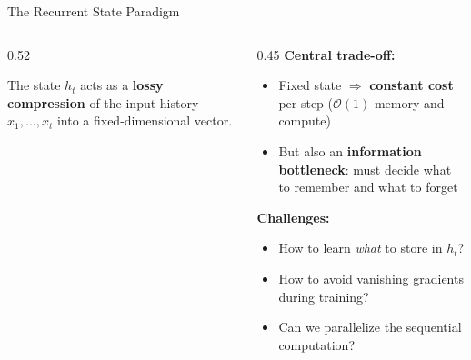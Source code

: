 \begin{frame}{The Recurrent State Paradigm}
  \begin{columns}[T]
    \begin{column}{0.52\textwidth}
      \begin{center}
      \end{center}

      \vspace{0.3em}
      The state $h_t$ acts as a \textbf{lossy compression} of the input history $x_1, \ldots, x_t$ into a fixed-dimensional vector.
    \end{column}
    \begin{column}{0.45\textwidth}
      \textbf{Central trade-off:}
      \begin{itemize}
        \item Fixed state $\Rightarrow$ \textbf{constant cost} per step ($\mathcal{O}(1)$ memory and compute)
        \item But also an \textbf{information bottleneck}: must decide what to remember and what to forget
      \end{itemize}

      \vspace{0.5em}
      \textbf{Challenges:}
      \begin{itemize}
        \item How to learn \emph{what} to store in $h_t$?
        \item How to avoid vanishing gradients during training?
        \item Can we parallelize the sequential computation?
      \end{itemize}
    \end{column}
  \end{columns}
\end{frame}

